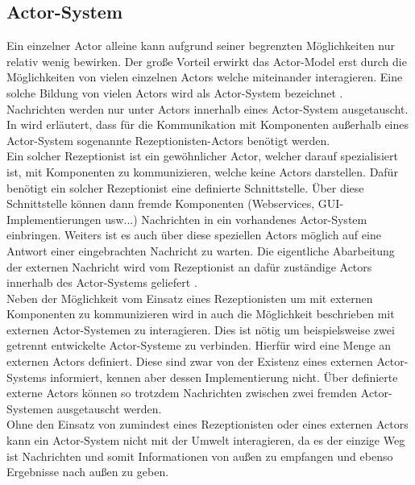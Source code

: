 \subsection{Actor-System}\label{actor:actorSystem}
Ein einzelner Actor alleine kann aufgrund seiner begrenzten Möglichkeiten nur relativ wenig bewirken. Der große Vorteil erwirkt das Actor-Model erst durch die Möglichkeiten von vielen einzelnen Actors welche miteinander interagieren. Eine solche Bildung von vielen Actors wird als Actor-System bezeichnet \citep{Agha1985ActorsSystems}.\\
Nachrichten werden nur unter Actors innerhalb eines Actor-System ausgetauscht. In \cite{Agha1985ActorsSystems} wird erläutert, dass für die Kommunikation mit Komponenten außerhalb eines Actor-System sogenannte Rezeptionisten-Actors benötigt werden.\\
Ein solcher Rezeptionist ist ein gewöhnlicher Actor, welcher darauf spezialisiert ist, mit Komponenten zu kommunizieren, welche keine Actors darstellen. Dafür benötigt ein solcher Rezeptionist eine definierte Schnittstelle. Über diese Schnittstelle können dann fremde Komponenten (Webservices, GUI-Implementierungen usw...) Nachrichten in ein vorhandenes Actor-System einbringen. Weiters ist es auch über diese speziellen Actors möglich auf eine Antwort einer eingebrachten Nachricht zu warten. Die eigentliche Abarbeitung der externen Nachricht wird vom Rezeptionist an dafür zuständige Actors innerhalb des Actor-Systems geliefert \citep{Agha1985ActorsSystems}.\\
Neben der Möglichkeit vom Einsatz eines Rezeptionisten um mit externen Komponenten zu kommunizieren wird in \cite{Agha1985ActorsSystems} auch die Möglichkeit beschrieben mit externen Actor-Systemen zu interagieren. Dies ist nötig um beispielsweise zwei getrennt entwickelte Actor-Systeme zu verbinden. Hierfür wird eine Menge an externen Actors definiert. Diese sind zwar von der Existenz eines externen Actor-Systems informiert, kennen aber dessen Implementierung nicht. Über definierte externe Actors können so trotzdem Nachrichten zwischen zwei fremden Actor-Systemen ausgetauscht werden. \\
Ohne den Einsatz von zumindest eines Rezeptionisten oder eines externen Actors kann ein Actor-System nicht mit der Umwelt interagieren, da es der einzige Weg ist Nachrichten und somit Informationen von außen zu empfangen und ebenso Ergebnisse nach außen zu geben. 







